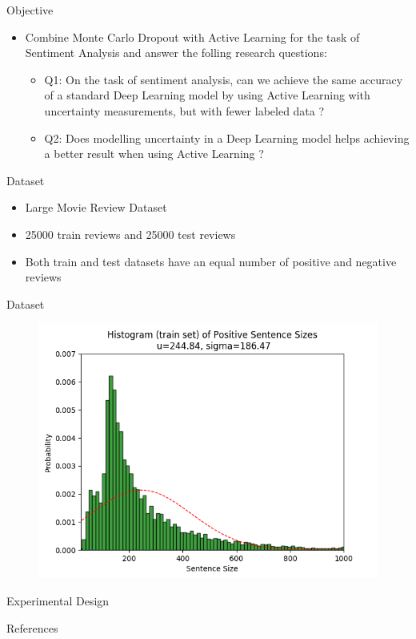 \documentclass[10pt]{beamer}
\begin{document}
\begin{frame}[fragile]{Objective}
\begin{itemize}
    \item Combine Monte Carlo Dropout with Active Learning for the task of
        Sentiment Analysis and answer the folling research questions:
        \vspace{0.5cm}

        \begin{itemize}
        \item \alert{Q1}: On the task of sentiment analysis, can we achieve the same
            accuracy of a standard Deep Learning model by using Active Learning
            with uncertainty measurements, but with fewer labeled data ?
        \item \alert{Q2}: Does modelling uncertainty in a Deep Learning model helps
            achieving a better result when using Active Learning ?
        \end{itemize}
    \vspace{0.5cm}
\end{itemize}
\end{frame}

\begin{frame}[fragile]{Dataset}
\begin{itemize}
    \item Large Movie Review Dataset
    \vspace{0.5cm}
    \item 25000 train reviews and 25000 test reviews
    \vspace{0.5cm}
    \item Both train and test datasets have an equal number of positive and
        negative reviews
\end{itemize}
\end{frame}

\begin{frame}[fragile]{Dataset}
    \begin{figure}[htp]
        \centering
        \includegraphics[scale=0.6]{images/train_positive_graph.png}
    \end{figure}
\end{frame}

\begin{frame}[fragile]{Experimental Design}
    
\end{frame}

\begin{frame}[allowframebreaks]{References}
  
  
\end{frame}
\end{document}
